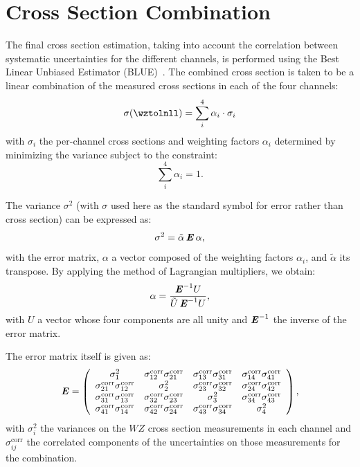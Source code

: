 \section{Cross Section Combination}

The final cross section estimation, taking into account the correlation between systematic uncertainties for the different channels, is performed using the Best Linear Unbiased Estimator (BLUE)~\cite{Lyons:1988rp}.  The combined cross section is taken to be a linear combination of the measured cross sections in each of the four channels:
\begin{equation}
  \sigma(\wztolnll) = \sum_i^4 \alpha_i\cdot\sigma_i
\end{equation}
with $\sigma_i$ the per-channel cross sections and weighting factors $\alpha_i$ determined by minimizing the variance subject to the constraint:
\begin{equation}
  \sum_i^4 \alpha_i = 1.
\end{equation}

The variance $\sigma^2$ (with $\sigma$ used here as the standard symbol for error rather than cross section) can be expressed as:
\begin{equation}
  \sigma^2 = \tilde{\alpha} \, \textbf{\textit{E}} \, \alpha,
\end{equation}
with \errmat the error matrix, $\alpha$ a vector composed of the weighting factors $\alpha_i$, and $\tilde{\alpha}$ its transpose.  By applying the method of Lagrangian multipliers, we obtain:
\begin{equation}
  \alpha = \frac{\textbf{\textit{E}}^{-1} U}{\tilde{U}\,\textbf{\textit{E}}^{-1}U},
\end{equation}
with $U$ a vector whose four components are all unity and $\textbf{\textit{E}}^{-1}$ the inverse of the error matrix.

\newcommand{\scorr}{\sigma^\text{corr}}
\newcommand{\discorr}[2]{\scorr_{#1#2}\scorr_{#2#1}}

The error matrix itself is given as:
\begin{equation}
  \errmat = \left(
    \begin{array}{cccc}
      \sigma_1^2     & \discorr{1}{2} & \discorr{1}{3} & \discorr{1}{4} \\
      \discorr{2}{1} & \sigma_2^2     & \discorr{2}{3} & \discorr{2}{4} \\
      \discorr{3}{1} & \discorr{3}{2} & \sigma_3^2     & \discorr{3}{4} \\
      \discorr{4}{1} & \discorr{4}{2} & \discorr{4}{3} & \sigma_4^2     \\
 \end{array}
\right),
\end{equation}
with $\sigma_i^2$ the variances on the $WZ$ cross section measurements in each channel and $\scorr_{ij}$ the correlated components of the uncertainties on those measurements for the combination.

